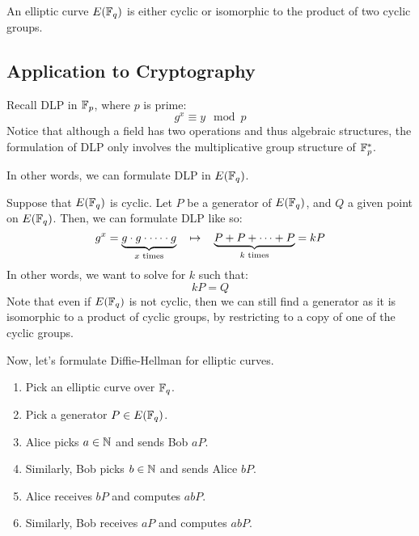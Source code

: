 \documentclass{article}
\begin{document}
\begin{thm}
    An elliptic curve $ E(\mathbb{F}_{q}) $ is either cyclic or isomorphic to
    the product of two cyclic groups.
\end{thm}

\subsection{Application to Cryptography}

Recall DLP in $ \mathbb{F}_{p} $, where $ p $ is prime:
\begin{equation*}
    g^{x} \equiv y \mod p
\end{equation*}
Notice that although a field has two operations and thus algebraic structures,
the formulation of DLP only involves the multiplicative group structure of $ \mathbb{F}_{p}^{*} $.

In other words, we can formulate DLP in $ E(\mathbb{F}_{q}) $.

Suppose that $ E(\mathbb{F}_{q}) $ is cyclic.
Let $ P $ be a generator of $ E(\mathbb{F}_{q}) $, and $ Q $ a given point on $ E(\mathbb{F}_{q}) $.
Then, we can formulate DLP like so:
\begin{equation*}
    g^{x} = \underbrace{g \cdot g \cdot \dots \cdot g}_{x \textrm{ times}} \quad \operatorname{\mapsto} \quad
    \underbrace{P + P + \dots + P}_{k \textrm{ times}} = kP
\end{equation*}
In other words, we want to solve for $ k $ such that:
\begin{equation*}
    kP = Q
\end{equation*}
Note that even if $ E(\mathbb{F}_{q}) $ is not cyclic, then we can still find a generator as it is
isomorphic to a product of cyclic groups, by restricting to a copy of one of the cyclic groups.

Now, let's formulate Diffie-Hellman for elliptic curves.
\begin{enumerate}
    \item Pick an elliptic curve over $ \mathbb{F}_{q} $.
    \item Pick a generator $ P \in E(\mathbb{F}_{q}) $.
    \item Alice picks $ a \in \mathbb{N} $ and sends Bob $ aP $.
    \item Similarly, Bob picks $ b \in \mathbb{N} $ and sends Alice $ bP $.
    \item Alice receives $ bP $ and computes $ abP $.
    \item Similarly, Bob receives $ aP $ and computes $ abP $.
\end{enumerate}
\end{document}

